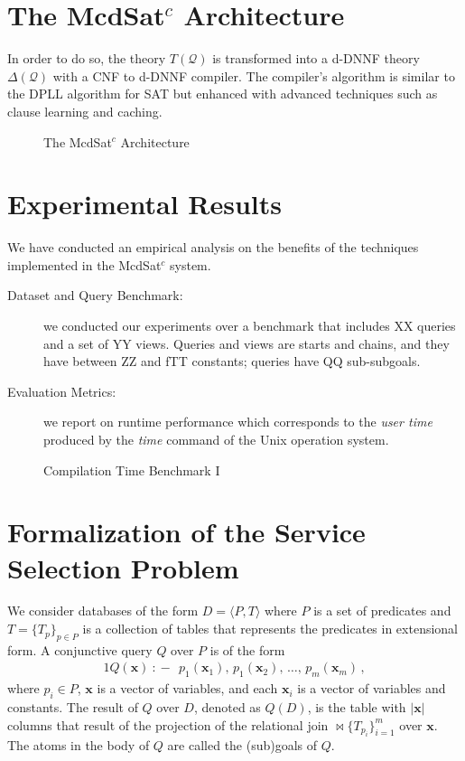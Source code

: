 \documentclass{article}
\newcommand{\tup}[1]{\langle #1 \rangle}
\newcommand{\vvec}[1]{\mathbf{#1}}
\newcommand{\join}{\bowtie}
\newcommand{\Q}{\mathcal{Q}}
\newcommand{\qrule}{:\!\!-}
\newcommand{\Theory}[1]{T(#1)}
\begin{document}
{\begin{description}
\end{description}

\section{The McdSat$^c$ Architecture}

In order to do so, the theory $\Theory{\Q}$ is transformed into a d-DNNF
theory $\Delta(\Q)$ with a CNF to d-DNNF compiler.
The compiler's algorithm is similar to the DPLL algorithm
for SAT but enhanced with advanced techniques such as clause
learning and caching.
\begin{figure}
\centering
\caption{The McdSat$^c$ Architecture}
\label{fig:dnnf}
\end{figure}



\section{Experimental Results}
We have conducted an empirical analysis  on the benefits of the techniques implemented in the   McdSat$^c$ system.

\begin{description}
\item[Dataset and Query Benchmark:]  we conducted our experiments over a benchmark that includes XX queries and a set of  YY views. Queries and views are starts and chains, and they have between ZZ and fTT constants; queries have QQ sub-subgoals.
\item[Evaluation Metrics:] we report on runtime performance which corresponds to the  {\it user time} produced by the {\it time} command of the Unix operation system. 
\end{description}
 
\begin{figure}
\centering
\caption{Compilation Time Benchmark I}
\label{fig:plot1}
\end{figure}


\section{Formalization of the Service Selection Problem}

We consider databases of the form $D=\tup{P,T}$ where
$P$ is a set of predicates and $T=\{T_p\}_{p\in P}$ is a collection
of tables that represents the predicates in extensional form.
A conjunctive query $Q$ over $P$ is of the form 
\begin{alignat*}{1}
Q(\vvec{x})\ \qrule\ \  p_1(\vvec{x}_1),\, p_1(\vvec{x}_2),\, \ldots,\, p_m(\vvec{x}_m)\,,
\end{alignat*}
where $p_i\in P$, $\vvec{x}$ is a vector of variables, and each
$\vvec{x}_i$ is a vector of variables and constants.
The result of $Q$ over $D$, denoted as $Q(D)$, is the table with
$|\vvec{x}|$ columns that result of the projection of the relational
join $\join\!\!\{T_{p_i}\}_{i=1}^m$ over $\vvec{x}$.
The atoms in the body of $Q$ are called the (sub)goals of $Q$.

}
\end{document}
